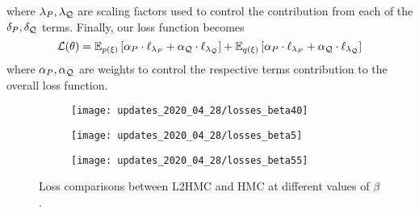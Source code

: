 %
where \(\lambda_{P}, \lambda_{{\mathcal{Q}}}\) are scaling factors used to control the
contribution from each of the \(\delta_{P}, \delta_{{\mathcal{Q}}}\) terms.
%
Finally, our loss function becomes
%
\begin{equation}
  \mathcal{L}{(\theta)} = \mathbb{E}_{p(\xi)}\left[
    \alpha_{P} \cdot \ell_{\lambda_{P}} + \alpha_{{\mathcal{Q}}} \cdot \ell_{\lambda_{{\mathcal{Q}}}}
  \right]
  + \mathbb{E}_{q(\xi)}\left[
    \alpha_{P} \cdot \ell_{\lambda_{P}} + \alpha_{{\mathcal{Q}}} \cdot \ell_{\lambda_{{\mathcal{Q}}}}
  \right]
\end{equation}
%
where \(\alpha_{P}, \alpha_{{\mathcal{Q}}}\) are weights to control the respective terms
contribution to the overall loss function.


\begin{figure}[htpb!]
  \centering
  \begin{subfigure}[t]{0.57\textwidth}
    \texttt{[image: updates\_2020\_04\_28/losses\_beta40]}%
  \label{fig:losses_beta4}
  \end{subfigure}
  \begin{subfigure}[t]{0.57\textwidth}
    \texttt{[image: updates\_2020\_04\_28/losses\_beta5]}%
    \label{fig:losses_beta5}
  \end{subfigure}
  \begin{subfigure}[t]{0.57\textwidth}
    \texttt{[image: updates\_2020\_04\_28/losses\_beta55]}%
    \label{fig:losses_beta55}
  \end{subfigure}
  \caption{Loss comparisons between L2HMC and HMC at different values of
  \(\beta\).}
\end{figure}
